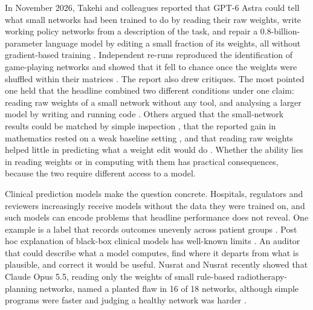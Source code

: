 \documentclass[11pt]{article}
\newcommand{\astra}{GPT-6 Astra}
\begin{document}
In November 2026, Takehi and colleagues reported that \astra{} could tell what small networks had been trained to do by reading their raw weights, write working policy networks from a description of the task, and repair a 0.8-billion-parameter language model by editing a small fraction of its weights, all without gradient-based training \cite{takehi2026}. Independent re-runs reproduced the identification of game-playing networks and showed that it fell to chance once the weights were shuffled within their matrices \cite{turing2026}. The report also drew critiques. The most pointed one held that the headline combined two different conditions under one claim: reading raw weights of a small network without any tool, and analysing a larger model by writing and running code \cite{honnibal2026}. Others argued that the small-network results could be matched by simple inspection \cite{goedecke2026}, that the reported gain in mathematics rested on a weak baseline setting \cite{toledo2026}, and that reading raw weights helped little in predicting what a weight edit would do \cite{singh2026}. Whether the ability lies in reading weights or in computing with them has practical consequences, because the two require different access to a model.

Clinical prediction models make the question concrete. Hospitals, regulators and reviewers increasingly receive models without the data they were trained on, and such models can encode problems that headline performance does not reveal. One example is a label that records outcomes unevenly across patient groups \cite{obermeyer2019}. Post hoc explanation of black-box clinical models has well-known limits \cite{rudin2019,ghassemi2021}. An auditor that could describe what a model computes, find where it departs from what is plausible, and correct it would be useful. Nusrat and Nusrat recently showed that Claude Opus 5.5, reading only the weights of small rule-based radiotherapy-planning networks, named a planted flaw in 16 of 18 networks, although simple programs were faster and judging a healthy network was harder \cite{nusrat2026}.
\end{document}
